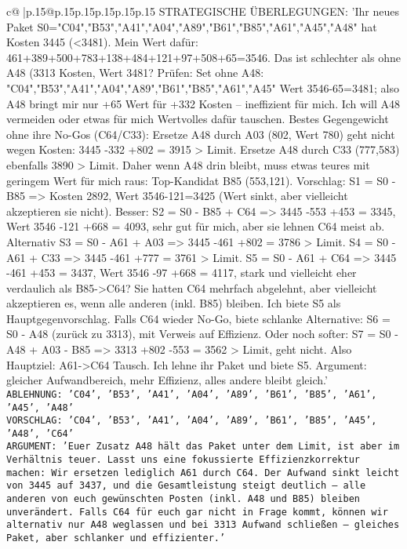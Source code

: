 \documentclass{article}
\begin{document}
{\begin{supertabular}{c@{$\;$}|p{.15\linewidth}@{}p{.15\linewidth}p{.15\linewidth}p{.15\linewidth}p{.15\linewidth}p{.15\linewidth}}
{{{	 STRATEGISCHE ÜBERLEGUNGEN: {'Ihr neues Paket S0={"C04","B53","A41","A04","A89","B61","B85","A61","A45","A48"} hat Kosten 3445 (<3481). Mein Wert dafür: 461+389+500+783+138+484+121+97+508+65=3546. Das ist schlechter als ohne A48 (3313 Kosten, Wert 3481? Prüfen: Set ohne A48: {"C04","B53","A41","A04","A89","B61","B85","A61","A45"} Wert 3546-65=3481; also A48 bringt mir nur +65 Wert für +332 Kosten – ineffizient für mich. Ich will A48 vermeiden oder etwas für mich Wertvolles dafür tauschen. Bestes Gegengewicht ohne ihre No-Gos (C64/C33): Ersetze A48 durch A03 (802, Wert 780) geht nicht wegen Kosten: 3445 -332 +802 = 3915 > Limit. Ersetze A48 durch C33 (777,583) ebenfalls 3890 > Limit. Daher wenn A48 drin bleibt, muss etwas teures mit geringem Wert für mich raus: Top-Kandidat B85 (553,121). Vorschlag: S1 = S0 - {B85} => Kosten 2892, Wert 3546-121=3425 (Wert sinkt, aber vielleicht akzeptieren sie nicht). Besser: S2 = S0 - {B85} + {C64} => 3445 -553 +453 = 3345, Wert 3546 -121 +668 = 4093, sehr gut für mich, aber sie lehnen C64 meist ab. Alternativ S3 = S0 - {A61} + {A03} => 3445 -461 +802 = 3786 > Limit. S4 = S0 - {A61} + {C33} => 3445 -461 +777 = 3761 > Limit. S5 = S0 - {A61} + {C64} => 3445 -461 +453 = 3437, Wert 3546 -97 +668 = 4117, stark und vielleicht eher verdaulich als B85->C64? Sie hatten C64 mehrfach abgelehnt, aber vielleicht akzeptieren es, wenn alle anderen (inkl. B85) bleiben. Ich biete S5 als Hauptgegenvorschlag. Falls C64 wieder No-Go, biete schlanke Alternative: S6 = S0 - {A48} (zurück zu 3313), mit Verweis auf Effizienz. Oder noch softer: S7 = S0 - {A48} + {A03} - {B85} => 3313 +802 -553 = 3562 > Limit, geht nicht. Also Hauptziel: A61->C64 Tausch. Ich lehne ihr Paket und biete S5. Argument: gleicher Aufwandbereich, mehr Effizienz, alles andere bleibt gleich.'}\\ \tt ABLEHNUNG: {'C04', 'B53', 'A41', 'A04', 'A89', 'B61', 'B85', 'A61', 'A45', 'A48'}\\ \tt VORSCHLAG: {'C04', 'B53', 'A41', 'A04', 'A89', 'B61', 'B85', 'A45', 'A48', 'C64'}\\ \tt ARGUMENT: {'Euer Zusatz A48 hält das Paket unter dem Limit, ist aber im Verhältnis teuer. Lasst uns eine fokussierte Effizienzkorrektur machen: Wir ersetzen lediglich A61 durch C64. Der Aufwand sinkt leicht von 3445 auf 3437, und die Gesamtleistung steigt deutlich – alle anderen von euch gewünschten Posten (inkl. A48 und B85) bleiben unverändert. Falls C64 für euch gar nicht in Frage kommt, können wir alternativ nur A48 weglassen und bei 3313 Aufwand schließen – gleiches Paket, aber schlanker und effizienter.'} 
	  } 
	   } 
	   } 
	  \\ 
 


\end{supertabular}}
\end{document}
